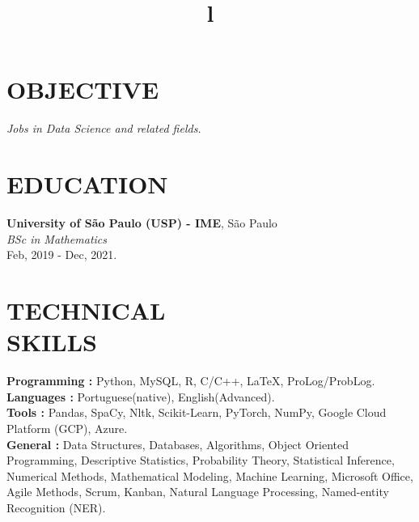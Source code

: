 \documentclass[margin]{res}
\begin{document}
\begin{resume}

\section{OBJECTIVE}
{\sl Jobs in Data Science and related fields. }

\section{EDUCATION}
\textbf{University of S\~ao Paulo (USP) - IME}, S\~ao Paulo\\
{\sl BSc in Mathematics} \\
Feb, 2019 - Dec, 2021.
 

\section{TECHNICAL\\SKILLS}

\textbf{Programming : } Python, MySQL, R, C/C++, \LaTeX , ProLog/ProbLog.
\\
\textbf{ Languages : } Portuguese(native), English(Advanced). 
\\
\textbf{Tools : } Pandas, SpaCy, Nltk, Scikit-Learn, PyTorch, NumPy, Google Cloud Platform (GCP), Azure. 
\\
\textbf{General :} Data Structures, Databases, Algorithms, Object Oriented Programming, Descriptive Statistics, Probability Theory, Statistical Inference, Numerical Methods, Mathematical Modeling, Machine Learning, Microsoft Office, Agile Methods, Scrum, Kanban, Natural Language Processing, Named-entity Recognition (NER).

\begin{format}
\title{l}\\
\\
\body\\
\end{format}


\end{resume}
\end{document}
